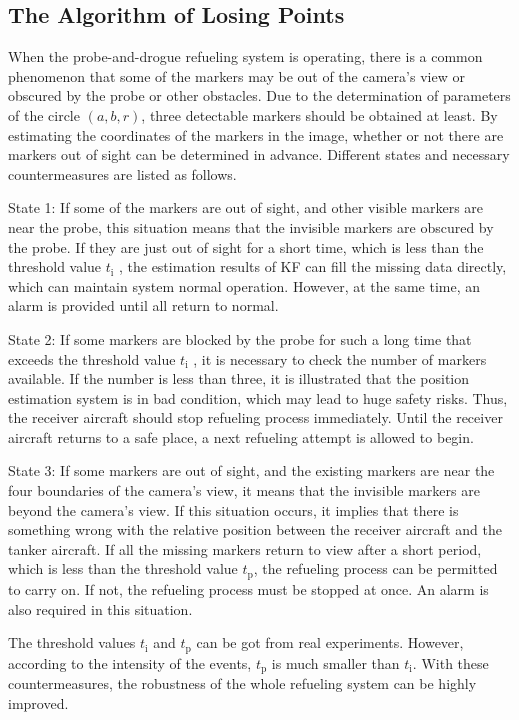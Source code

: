 \subsection{The Algorithm of Losing Points}

When the probe-and-drogue refueling system is operating, there is a common
phenomenon that some of the markers may be out of the camera's view or
obscured by the probe or other obstacles. Due to the determination of
parameters of the circle $(a,b,r)$, three detectable markers should
be obtained at least. By estimating the coordinates of the markers in the image,
whether or not there are markers out of sight can be determined in advance.
Different states and necessary countermeasures are listed as follows.

State 1: If some of the markers are out of sight, and other visible markers
are near the probe, this situation means that the invisible markers are obscured by the
probe. If they are just out of sight for a short time, which is less than the
threshold value $t_{\mathrm{i}}$ , the estimation results of KF can fill
the missing data directly, which can maintain system normal operation. However, at the same
time, an alarm is provided until all return to normal.

State 2: If some markers are blocked by the probe for such a long time that
exceeds the threshold value $t_{\mathrm{i}}$ , it is necessary to check the number of
markers available. If the number is less than three, it is illustrated that
the position estimation system is in bad condition, which may lead to huge
safety risks. Thus, the receiver aircraft should stop refueling process
immediately. Until the receiver aircraft returns to a safe place, a next
refueling attempt is allowed to begin.

State 3: If some markers are out of sight, and the existing markers
are near the four boundaries of the camera's view, it means that the
invisible markers are beyond the camera's view. If this situation occurs,
it implies that there is something wrong with the relative position between
the receiver aircraft and the tanker aircraft. If all the missing markers
return to view after a short period, which is less than the threshold value $t_{\mathrm{p}}$, the refueling process can be permitted to carry on. If not, the refueling process must be stopped at once. An alarm is
also required in this situation.

The threshold values $t_{\mathrm{i}}$ and $t_{\mathrm{p}}$ can be got from real experiments.
However, according to the intensity of the events, $t_{\mathrm{p}}$ is much smaller than $%
t_{\mathrm{i}} $. With these countermeasures, the robustness of the whole refueling
system can be highly improved.


